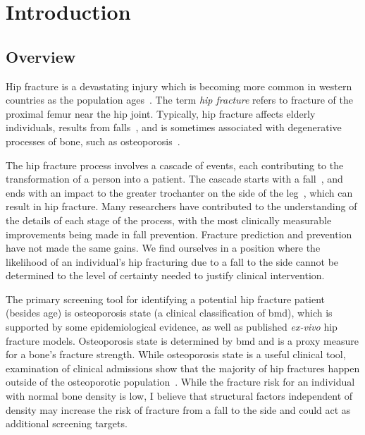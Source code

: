 

\chapter{Introduction}
\label{ch:intro}

\section{Overview}
\label{sec:intro_overview}
Hip fracture is a devastating injury which is becoming more common in western countries as the population ages~\citep{leslie_trends_2009, sirois_burden_2009}.
The term \textit{hip fracture} refers to fracture of the proximal femur near the hip joint.
Typically, hip fracture affects elderly individuals, results from falls~\cite{kannus_sideways_2006, parkkari_majority_1999}, and is sometimes associated with degenerative processes of bone, such as osteoporosis~\citep{leslie_trends_2009, nguyen_identification_2005}.

The hip fracture process involves a cascade of events, each contributing to the transformation of a person into a patient.
The cascade starts with a fall~\citep{hayes_etiology_1996}, and ends with an impact to the greater trochanter on the side of the leg~\citep{grisso_risk_1991}, which can result in hip fracture.
Many researchers have contributed to the understanding of the details of each stage of the process, with the most clinically measurable improvements being made in fall prevention.
Fracture prediction and prevention have not made the same gains.
We find ourselves in a position where the likelihood of an individual's hip fracturing due to a fall to the side cannot be determined to the level of certainty needed to justify clinical intervention.

The primary screening tool for identifying a potential hip fracture patient (besides age) is osteoporosis state (a clinical classification of \ac{bmd}), which is supported by some epidemiological evidence, as well as published \textit{ex-vivo} hip fracture models.
Osteoporosis state is determined by \ac{bmd} and is a proxy measure for a bone's fracture strength.
While osteoporosis state is a useful clinical tool, examination of clinical admissions show that the majority of hip fractures happen outside of the osteoporotic population~\citep{leslie_fracture_2011, siris_bone_2004, greenspan_fall_1994, stone_bmd_2003}.
While the fracture risk for an individual with normal bone density is low, I believe that structural factors independent of density may increase the risk of fracture from a fall to the side and could act as additional screening targets.

